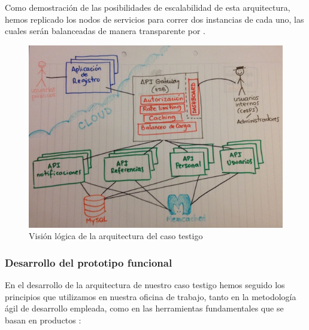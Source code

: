 Como demostración de las posibilidades de escalabilidad de esta arquitectura, hemos replicado los nodos de servicios para correr dos instancias de cada uno, las cuales serán balanceadas de manera transparente por .

\begin{figure}[H]
  \includegraphics[width=\linewidth]{src/images/05-capitulo-5/arquitectura-caso-testigo.jpg}
  \caption{Visión lógica de la arquitectura del caso testigo}
  \label{fig:arquitectura-caso-testigo}
\end{figure}

\subsubsection{Desarrollo del prototipo funcional}

En el desarrollo de la arquitectura de nuestro caso testigo hemos seguido los principios que utilizamos en nuestra oficina de trabajo, tanto en la metodología ágil de desarrollo empleada, como en las herramientas fundamentales que se basan en productos :

